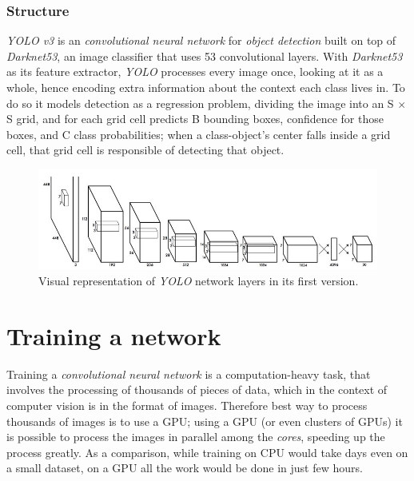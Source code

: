 	\subsubsection{Structure}
	\emph{YOLO v3} is an \emph{convolutional neural network} for \emph{object detection} built on top of \emph{Darknet53}, an image classifier that uses 53 convolutional layers. With \emph{Darknet53} as its feature extractor, \emph{YOLO}  processes every image once, looking at it as a whole, hence encoding extra information about the context each class lives in. To do so it models detection as a regression
problem, dividing the image into an S $\times$ S grid, and for each grid cell predicts B bounding boxes, confidence for those boxes, and C class probabilities; when a class-object's center falls inside a grid cell, that grid cell is responsible of detecting that object.
	
	\begin{figure}[htbp]
\begin{center}
\includegraphics[width=\textwidth]{immagini/pictures/yololayers.jpeg} 
\caption{Visual representation of \emph{YOLO} network layers in its first version.}
\end{center}
\end{figure}

	
\section{Training a network}
	Training a \emph{convolutional neural network} is a computation-heavy task, that involves the processing of thousands of pieces of data, which in the context of computer vision is in the format of images. Therefore best way to process thousands of images is to use a GPU; using a GPU (or even clusters of GPUs) it is possible to process the images in parallel among the \emph{cores}, speeding up the process greatly. As a comparison, while training on CPU would take days even on a small dataset, on a GPU all the work would be done in just few hours.
